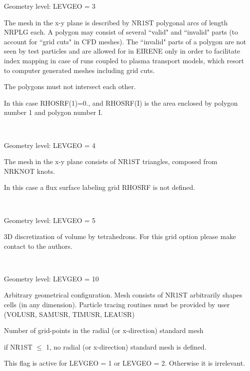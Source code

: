 \begin{description}
        Geometry level: LEVGEO = 3 

        The mesh in the x-y plane is described by NR1ST polygonal arcs of length NRPLG
        each.
        A polygon may consist of several ``valid" and ``invalid" parts (to account for
        ``grid cuts" in \ac{CFD} meshes).
        The ``invalid" parts of a polygon are not seen by test particles and are
        allowed for in EIRENE only in order to facilitate index mapping in case of runs
        coupled to plasma transport models, which resort to computer generated meshes
        including grid cuts.

        The polygons must not intersect each other.

        In this case RHOSRF(1)=0., and RHOSRF(I) is the area enclosed by polygon number
        1 and polygon number I.
  \item[NLFEM = .TRUE.] ~

        Geometry level: LEVGEO = 4 

        The mesh in the x-y plane consists of NR1ST triangles, composed from NRKNOT
        knots.

        In this case a flux surface labeling grid RHOSRF is not defined.
  \item[NLTET = .TRUE.] ~

        Geometry level: LEVGEO = 5 

        3D discretization of volume by tetrahedrons.
        For this grid option please make contact to the authors.
  \item[NLGEN = .TRUE.] ~

        Geometry level: LEVGEO = 10 

        Arbitrary geometrical configuration.
        Mesh consists of NR1ST arbitrarily shapes cells (in any dimension).
        Particle tracing routines must be provided by user (VOLUSR, SAMUSR, TIMUSR,
        LEAUSR) 

        \medskip 

  \item[NR1ST] Number of grid-points in the radial (or x-direction) standard mesh

        if NR1ST $\le$ 1, no radial (or x-direction) standard mesh is defined.
  \item[NRSEP] This flag is active for LEVGEO = 1 or LEVGEO = 2.
        Otherwise it is irrelevant.


\end{description}
